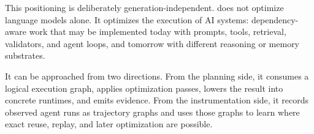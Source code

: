 This positioning is deliberately generation-independent. \migaki{} does not optimize language models alone. It optimizes the execution of AI systems: dependency-aware work that may be implemented today with prompts, tools, retrieval, validators, and agent loops, and tomorrow with different reasoning or memory substrates.

It can be approached from two directions. From the planning side, it consumes a logical execution graph, applies optimization passes, lowers the result into concrete runtimes, and emits evidence. From the instrumentation side, it records observed agent runs as trajectory graphs and uses those graphs to learn where exact reuse, replay, and later optimization are possible.
